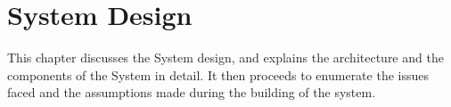 \section{System Design}
This chapter discusses the System design, and explains the architecture and the components of the System in detail. It then proceeds to enumerate the issues faced and the assumptions made during the building of the system. 






